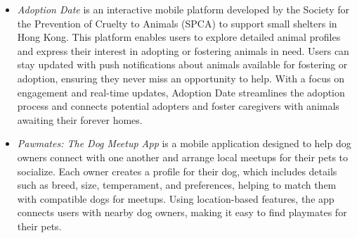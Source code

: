 \begin{itemize}
 \item \textit{Adoption Date }is an interactive mobile platform developed by the Society for the Prevention of Cruelty to Animals (SPCA) to support small shelters in Hong Kong. This platform enables users to explore detailed animal profiles and express their interest in adopting or fostering animals in need. Users can stay updated with push notifications about animals available for fostering or adoption, ensuring they never miss an opportunity to help. With a focus on engagement and real-time updates, Adoption Date streamlines the adoption process and connects potential adopters and foster caregivers with animals awaiting their forever homes.

 \item  \textit{Pawmates: The Dog Meetup App} is a mobile application designed to help dog owners connect with one another and arrange local meetups for their pets to socialize. Each owner creates a profile for their dog, which includes details such as breed, size, temperament, and preferences, helping to match them with compatible dogs for meetups. Using location-based features, the app connects users with nearby dog owners, making it easy to find playmates for their pets.
 \end{itemize}

                
